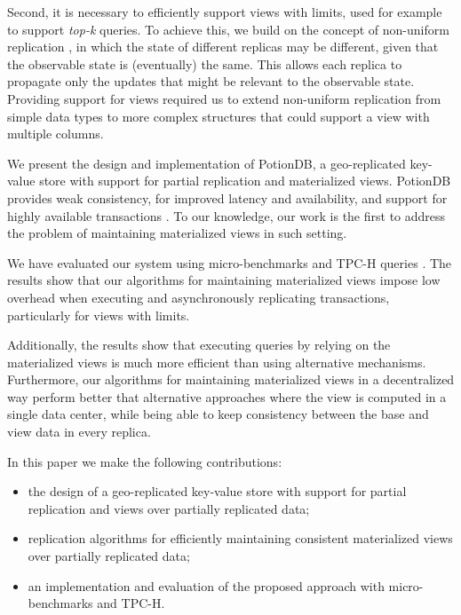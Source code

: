 \documentclass{vldb}
\newcommand{\grumbler}[2]{{\color{red}{\bf #1:} #2}}
\renewcommand{\grumbler}[2]{}
\newcommand{\andre}[1]{\grumbler{andre}{#1}}
\newcommand{\nuno}[1]{\grumbler{nuno}{#1}}
\begin{document}
Second, it is necessary to efficiently support views with limits, used for example to support \emph{top-k} 
queries. To achieve this, we build on the concept of non-uniform replication \cite{Cabrita17Nonuniform}, in which the state
of different replicas may be different, given that the observable state is (eventually) the same.
This allows each replica to propagate only the updates that might be relevant to the observable 
state. Providing support for views required us to extend non-uniform replication from simple data 
types to more complex structures that could support a view with multiple columns.

We present the design and implementation of PotionDB, a geo-replicated key-value store with support  
for partial replication and materialized views. 
PotionDB provides weak consistency, for improved latency and availability, and support for highly
available transactions \cite{hat}.  
To our knowledge, our work is the first to address the problem of maintaining materialized views
in such setting.  

\andre{We'll need to review the paragraph below after the evaluation section is ``finished for good''}

We have evaluated our system using micro-benchmarks and TPC-H queries \cite{tpch}.
The results show that our algorithms for maintaining materialized views impose 
low overhead when executing and asynchronously replicating transactions, particularly
for views with limits.
\nuno{deviamos ter uns micro-benchmarks que comparassem o overhead com limites e sem limites}
Additionally, the results show that executing queries by relying on the materialized views is much more 
efficient than using alternative mechanisms.  
Furthermore, our algorithms for maintaining materialized views in a decentralized way perform better 
that alternative approaches where the view is computed in a single data center, while being
able to  keep consistency between the base and view data in every replica.

In this paper we make the following contributions:
\begin{itemize}
	\item the design of a geo-replicated key-value store  with support for partial replication
	and views over partially replicated data; 
	\item replication algorithms for efficiently maintaining consistent materialized views over 
	partially replicated data;
	 \item an implementation and evaluation of the proposed approach with micro-benchmarks
	 and TPC-H.
\end{itemize}
\end{document}
